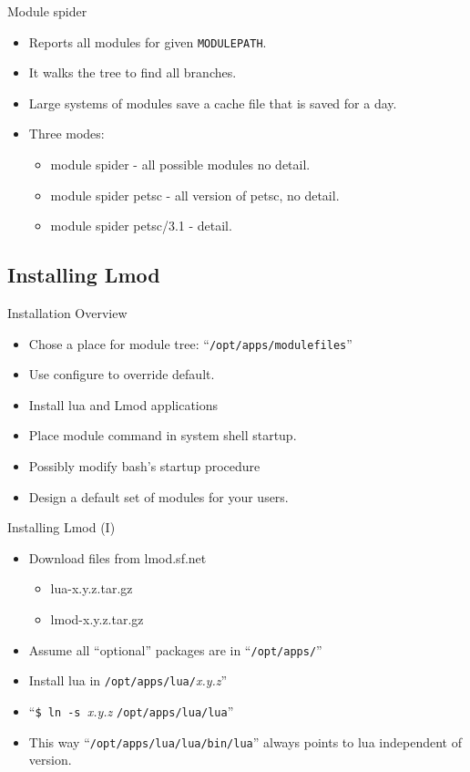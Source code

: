 \documentclass{beamer}
\begin{document}
\begin{frame}{Module spider}
  \begin{itemize}
    \item Reports all modules for given \texttt{MODULEPATH}.
    \item It walks the tree to find all branches.
    \item Large systems of modules save a cache file that is saved for
      a day.
    \item Three modes:
      \begin{itemize}
        \item module spider - all possible modules no detail.
        \item module spider petsc - all version of petsc, no detail.
        \item module spider petsc/3.1 - detail.
      \end{itemize}
  \end{itemize}
\end{frame}

\subsection{Installing Lmod}
\label{sec:installing}

\begin{frame}{Installation Overview}
  \begin{itemize}
    \item Chose a place for module tree: ``\texttt{/opt/apps/modulefiles}''
    \item Use configure to override default.
    \item Install lua and Lmod applications
    \item Place module command in system shell startup.
    \item Possibly modify bash's startup procedure
    \item Design a default set of modules for your users.
  \end{itemize}
\end{frame}


\begin{frame}{Installing Lmod (I)}
  \begin{itemize}
    \item Download files from lmod.sf.net
      \begin{itemize}
        \item lua-x.y.z.tar.gz
        \item lmod-x.y.z.tar.gz
      \end{itemize}
    \item Assume all ``optional'' packages are in ``\texttt{/opt/apps/}''
    \item Install lua in \texttt{/opt/apps/lua/}\emph{x.y.z}''
    \item ``\texttt{\$ ln -s }\emph{x.y.z} \texttt{/opt/apps/lua/lua}''
    \item This way ``\texttt{/opt/apps/lua/lua/bin/lua}'' always points to
      lua independent of version.
  \end{itemize}
\end{frame}
\end{document}
